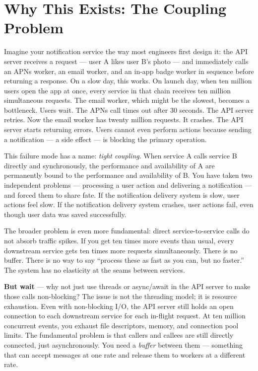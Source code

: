 \documentclass[11pt,a4paper]{article}
\begin{document}
\section{Why This Exists: The Coupling Problem}

Imagine your notification service the way most engineers first design it: the API server receives a request --- user A likes user B's photo --- and immediately calls an APNs worker, an email worker, and an in-app badge worker in sequence before returning a response. On a slow day, this works. On launch day, when ten million users open the app at once, every service in that chain receives ten million simultaneous requests. The email worker, which might be the slowest, becomes a bottleneck. Users wait. The APNs call times out after 30 seconds. The API server retries. Now the email worker has twenty million requests. It crashes. The API server starts returning errors. Users cannot even perform actions because sending a notification --- a side effect --- is blocking the primary operation.

This failure mode has a name: \textit{tight coupling}. When service A calls service B directly and synchronously, the performance and availability of A are permanently bound to the performance and availability of B. You have taken two independent problems --- processing a user action and delivering a notification --- and forced them to share fate. If the notification delivery system is slow, user actions feel slow. If the notification delivery system crashes, user actions fail, even though user data was saved successfully.

The broader problem is even more fundamental: direct service-to-service calls do not absorb traffic spikes. If you get ten times more events than usual, every downstream service gets ten times more requests simultaneously. There is no buffer. There is no way to say ``process these as fast as you can, but no faster.'' The system has no elasticity at the seams between services.

\begin{thinkbox}
\textbf{But wait} --- why not just use threads or async/await in the API server to make those calls non-blocking? The issue is not the threading model; it is resource exhaustion. Even with non-blocking I/O, the API server still holds an open connection to each downstream service for each in-flight request. At ten million concurrent events, you exhaust file descriptors, memory, and connection pool limits. The fundamental problem is that callers and callees are still directly connected, just asynchronously. You need a \textit{buffer} between them --- something that can accept messages at one rate and release them to workers at a different rate.
\end{thinkbox}
\end{document}
